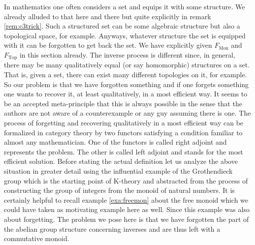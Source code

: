In mathematics one often considers a set and equips it with some structure. We already alluded to that here and there but quite explicitly in remark \ref{rem:c3trick}. Such a structured set can be some algebraic structure but also a topological space, for example. Anyways, whatever structure the set is equipped with it can be forgotten to get back the set. We have explicitly given $F_{\mathrm{Mon}}$ and $F_{\mathrm{Top}}$ in this section already. The inverse process is different since, in general, there may be many qualitatively equal (or say homomorphic) structures on a set. That is, given a set, there can exist many different topologies on it, for example. So our problem is that we have forgotten something and if one forgets something one wants to recover it, at least qualitatively, in a most efficient way. It seems to be an accepted meta-principle that this is always possible in the sense that the authors are not aware of a counterexample or any guy assuming there is one. The process of forgetting and recovering qualitatively in a most efficient way can be formalized in category theory by two functors satisfying a condition familiar to almost any mathematician. One of the functors is called right adjoint and represents the problem. The other is called left adjoint and stands for the most efficient solution. Before stating the actual definition let us analyze the above situation in greater detail using the influential example of the Grothendieck group which is the starting point of K-theory and abstracted from the process of constructing the group of integers from the monoid of natural numbers. It is certainly helpful to recall example \ref{exa:freemon} about the free monoid which we could have taken as motivating example here as well. Since this example was also about forgetting. The problem we pose here is that we have forgotten the part of the abelian group structure concerning inverses and are thus left with a commutative monoid.
\\
